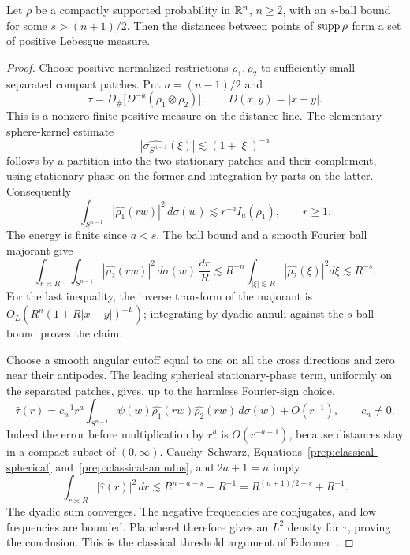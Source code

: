 \begin{lemma}\label{prep:classical-plane}
Let $\rho$ be a compactly supported probability in $\mathbb R^n$, $n\ge2$,
with an $s$-ball bound for some $s>(n+1)/2$. Then the distances
between points of $\operatorname{supp}\rho$ form a set of positive Lebesgue measure.
\end{lemma}
\begin{proof}
Choose positive normalized restrictions $\rho_1,\rho_2$ to sufficiently
small separated compact patches. Put $a=(n-1)/2$ and
\[
 \tau=D_\#\bigl[D^{-a}(\rho_1\otimes\rho_2)\bigr],
 \qquad D(x,y)=|x-y|.
\]
This is a nonzero finite positive measure on the distance line.
The elementary sphere-kernel estimate
\[
 |\widehat{\sigma_{S^{n-1}}}(\xi)|\lesssim(1+|\xi|)^{-a}
\]
follows by a partition into the two stationary patches and their
complement, using stationary phase on the former and integration by
parts on the latter. Consequently
\begin{equation}\label{prep:classical-spherical}
 \int_{S^{n-1}}|\widehat{\rho_1}(rw)|^2\,d\sigma(w)
 \lesssim r^{-a}I_a(\rho_1),\qquad r\ge1.
\end{equation}
The energy is finite since $a<s$. The ball bound and a smooth Fourier
ball majorant give
\begin{equation}\label{prep:classical-annulus}
 \int_{r\asymp R}\int_{S^{n-1}}
       |\widehat{\rho_2}(rw)|^2\,d\sigma(w)\,\frac{dr}{R}
 \lesssim R^{-n}\int_{|\xi|\lesssim R}|\widehat{\rho_2}(\xi)|^2d\xi
 \lesssim R^{-s}.
\end{equation}
For the last inequality, the inverse transform of the majorant is
$O_L(R^n(1+R|x-y|)^{-L})$; integrating by dyadic annuli against
the $s$-ball bound proves the claim.

Choose a smooth angular cutoff equal to one on all the cross directions
and zero near their antipodes. The leading spherical stationary-phase
term, uniformly on the separated patches, gives, up to the harmless
Fourier-sign choice,
\[
 \widehat\tau(r)=c_n^{-1}r^a
 \int_{S^{n-1}}\psi(w)\widehat{\rho_1}(rw)
                 \overline{\widehat{\rho_2}(rw)}\,d\sigma(w)
 +O(r^{-1}),\qquad c_n\ne0.
\]
Indeed the error before multiplication by $r^a$ is $O(r^{-a-1})$,
because distances stay in a compact subset of $(0,\infty)$.
Cauchy--Schwarz, Equations~\eqref{prep:classical-spherical}
and~\eqref{prep:classical-annulus}, and $2a+1=n$ imply
\[
 \int_{r\asymp R}|\widehat\tau(r)|^2\,dr
 \lesssim R^{n-a-s}+R^{-1}
 =R^{(n+1)/2-s}+R^{-1}.
\]
The dyadic sum converges. The negative frequencies are conjugates,
and low frequencies are bounded. Plancherel therefore gives an $L^2$
density for $\tau$, proving the conclusion. This is the classical
threshold argument of Falconer~\cite{Falconer1985}.
\end{proof}

